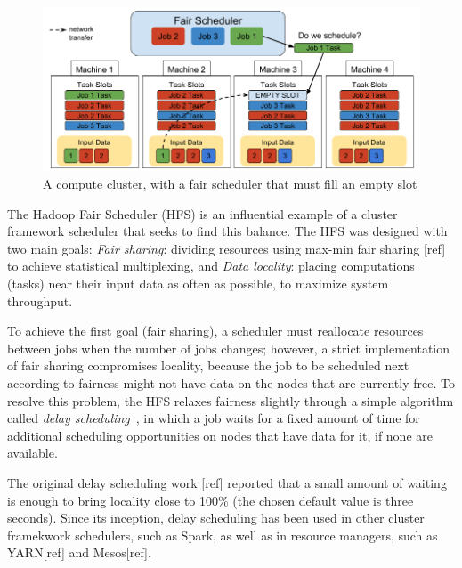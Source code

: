 \documentclass[10pt,conference,compsocconf,letterpaper]{IEEEtran}
\begin{document}
\begin{figure}[t]
        \includegraphics[width=\linewidth]{./fig1.png}
        \caption{A compute cluster, with a fair scheduler that must fill an empty slot}
        \label{fig:cluster}
    \endminipage
\end{figure}

The Hadoop Fair Scheduler (HFS) is an influential example of a cluster framework 
scheduler that seeks to find this balance. The HFS was designed with two main goals: 
\textit{Fair sharing}: dividing resources using max-min fair sharing [ref] to achieve 
statistical multiplexing, and 
\textit{Data locality}: placing computations (tasks) near their input data as often as
possible, to maximize system throughput.

To achieve the first goal (fair sharing), a scheduler must reallocate resources between 
jobs when the number of jobs changes; however, a strict implementation of fair sharing 
compromises locality, because the job to be scheduled next according to fairness might not
have data on the nodes that are currently free. To resolve this problem, the HFS relaxes 
fairness slightly through a simple algorithm called 
\textit{delay scheduling}~\cite{Zaharia:2010}, in which a 
job waits for a fixed amount of time for additional scheduling opportunities on nodes 
that have data for it, if none are available.

The original delay scheduling work [ref] reported that a small amount of waiting is enough
to bring locality close to 100\% (the chosen default value is three seconds). Since its 
inception, delay scheduling has been used in other cluster framekwork schedulers, such as 
Spark, as well as in resource managers, such as YARN[ref] and Mesos[ref]. 
\end{document}
